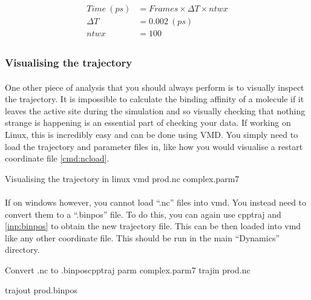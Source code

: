     \begin{equation}
        \begin{split}
        Time ~(ps) &= Frames \times \Delta T \times ntwx \\
        \Delta T &= 0.002 ~(ps)             \\
        ntwx &= 100                      \\      
        \end{split}
        \label{eq:frametotime}
    \end{equation}

    \subsubsection{Visualising the trajectory}
    \paragraph{}
        One other piece of analysis that you should always perform is to visually inspect the trajectory. It is impossible to calculate the binding affinity of a molecule if it leaves the active site during the simulation and so visually checking that nothing strange is happening is an essential part of checking your data. If working on Linux, this is incredibly easy and can be done using VMD. You simply need to load the trajectory and parameter files in, like how you would visualise a restart coordinate file \cref{cmd:ncload}.

    \begin{bashcmd}[label=cmd:ncload]{Visualising the trajectory in linux}
        vmd prod.nc complex.parm7
    \end{bashcmd}

    \paragraph{}
        If on windows however, you cannot load \enquote{.nc} files into vmd. You instead need to convert them to a \enquote{.binpos} file. To do this, you can again use cpptraj and \cref{inp:binpos} to obtain the new trajectory file. This can be then loaded into vmd like any other coordinate file. This should be run in the main \enquote{Dynamics} directory.

    \begin{inpfile}[label=inp:binpos]{Convert .nc to .binpos}{cpptraj}
        parm complex.parm7
        trajin prod.nc

        trajout prod.binpos
    \end{inpfile}